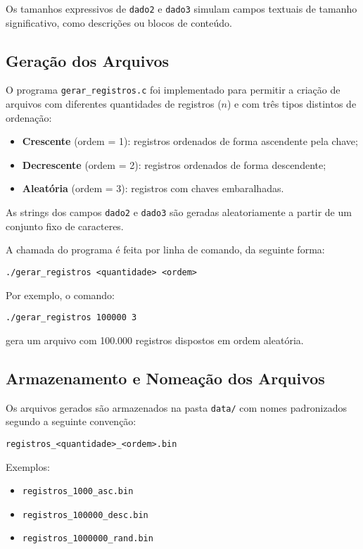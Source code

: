 \documentclass[12pt,a4paper,brazil]{article}
\begin{document}
Os tamanhos expressivos de \texttt{dado2} e \texttt{dado3} simulam campos textuais de tamanho significativo, como descrições ou blocos de conteúdo.

\subsection{Geração dos Arquivos}

O programa \texttt{gerar\_registros.c} foi implementado para permitir a criação de arquivos com diferentes quantidades de registros ($n$) e com três tipos distintos de ordenação:

\begin{itemize}
  \item \textbf{Crescente} (ordem = 1): registros ordenados de forma ascendente pela chave;
  \item \textbf{Decrescente} (ordem = 2): registros ordenados de forma descendente;
  \item \textbf{Aleatória} (ordem = 3): registros com chaves embaralhadas.
\end{itemize}

As strings dos campos \texttt{dado2} e \texttt{dado3} são geradas aleatoriamente a partir de um conjunto fixo de caracteres.

A chamada do programa é feita por linha de comando, da seguinte forma:

\begin{verbatim}
./gerar_registros <quantidade> <ordem>
\end{verbatim}

Por exemplo, o comando:

\begin{verbatim}
./gerar_registros 100000 3
\end{verbatim}

gera um arquivo com 100.000 registros dispostos em ordem aleatória.

\subsection{Armazenamento e Nomeação dos Arquivos}

Os arquivos gerados são armazenados na pasta \texttt{data/} com nomes padronizados segundo a seguinte convenção:

\begin{center}
\texttt{registros\_<quantidade>\_<ordem>.bin}
\end{center}

Exemplos:
\begin{itemize}
  \item \texttt{registros\_1000\_asc.bin}
  \item \texttt{registros\_100000\_desc.bin}
  \item \texttt{registros\_1000000\_rand.bin}
\end{itemize}
\end{document}
